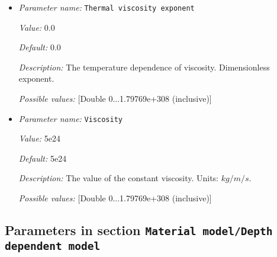 \begin{itemize}
{\it Possible values:} [Double 0...1.79769e+308 (inclusive)]
\item {\it Parameter name:} {\tt Thermal viscosity exponent}
\label{parameters:Material model/Composition reaction model/Thermal viscosity exponent}


{\it Value:} 0.0


{\it Default:} 0.0


{\it Description:} The temperature dependence of viscosity. Dimensionless exponent.


{\it Possible values:} [Double 0...1.79769e+308 (inclusive)]
\item {\it Parameter name:} {\tt Viscosity}
\label{parameters:Material model/Composition reaction model/Viscosity}


{\it Value:} 5e24


{\it Default:} 5e24


{\it Description:} The value of the constant viscosity. Units: $kg/m/s$.


{\it Possible values:} [Double 0...1.79769e+308 (inclusive)]
\end{itemize}

\subsection{Parameters in section \tt Material model/Depth dependent model}
\label{parameters:Material_20model/Depth_20dependent_20model}

